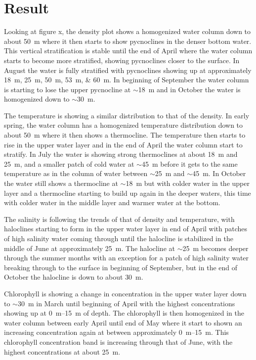 \documentclass[../Main.tex]{subfiles}
\begin{document}
\section*{\crule[blue]{.3cm}{.3cm} Result}
Looking at figure x, the density plot shows a homogenized water column down to about \SI{50}{\metre} where it then starts to show pycnoclines in the denser bottom water.
 This vertical stratification is stable until the end of April where the water column starts to become more stratified, showing pycnoclines closer to the surface.
In August the water is fully stratified with pycnoclines showing up at approximately \SIlist{18;25;50;53;60}{\metre}. 
In beginning of September the water column is starting to lose the upper pycnocline at $\sim$\SI{18}{\metre} and in October the water is homogenized down to $\sim$\SI{30}{\metre}.

The temperature is showing a similar distribution to that of the density. 
In early spring, the water column has a homogenized temperature distribution down to about \SI{50}{\metre} where it then shows a thermocline. 
The temperature then starts to rise in the upper water layer and in the end of April the water column start to stratify. 
In July the water is showing strong thermoclines at about \SI{18}{\metre} and \SI{25}{\metre}, and a smaller patch of cold water at $\sim$\SI{45}{\metre} before it gets to the same temperature as in the column of water between $\sim$\SI{25}{\metre} and $\sim$\SI{45}{\metre}. 
In October the water still shows a thermocline at $\sim$\SI{18}{\metre} but with colder water in the upper layer and a thermocline starting to build up again in the deeper waters, this time with colder water in the middle layer and warmer water at the bottom. 

The salinity is following the trends of that of density and temperature, with haloclines starting to form in the upper water layer in end of April with patches of high salinity water coming through until the halocline is stabilized in the middle of June at approximately \SI{25}{\metre}. 
The halocline at $\sim$\SI{25}{\metre} becomes deeper through the summer months with an exception for a patch of high salinity water breaking through to the surface in beginning of September, but in the end of October the halocline is down to about \SI{30}{\metre}. 

Chlorophyll is showing a change in concentration in the upper water layer down to $\sim$\SI{30}{\metre} in March until beginning of April with the highest concentrations showing up at \SIrange{0}{15}{\metre} of depth. 
The chlorophyll is then homogenized in the water column between early April until end of May where it start to shown an increasing concentration again at between approximately \SIrange{0}{15}{\metre}. 
This chlorophyll concentration band is increasing through that of June, with the highest concentrations at about \SI{25}{\metre}. 
\end{document}
